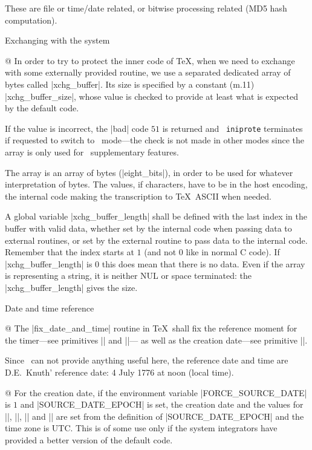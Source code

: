These are file or time/date related, or bitwise processing related
(MD5 hash computation).

\begindiv Exchanging with the system

@ In order to try to protect the inner code of \TeX, when we need to
exchange with some externally provided routine, we use a separated
dedicated array of
bytes called |xchg_buffer|. Its size is specified by a constant (m.11)
|xchg_buffer_size|, whose value is checked to provide at least what is
expected by the default code.

If the value is incorrect, the |bad| code $51$ is returned and {\tt
iniprote} terminates if requested to switch to \Prote\ mode---the check
is not made in other modes since the array is only used for \Prote\
supplementary features.

The array is an array of bytes (|eight_bits|), in order to be used for
whatever interpretation of bytes. The values, if characters, have to be
in the host encoding, the internal code making the transcription to
\TeX\ ASCII when needed.

A global variable |xchg_buffer_length| shall be defined with the
last index in the buffer with valid data, whether set by the internal
code when passing data to external routines, or set by the external
routine to pass data to the internal code. Remember that the index
starts at $1$ (and not $0$ like in normal C code). If |xchg_buffer_length|
is $0$ this does mean that there is no data. Even if the array is
representing a string, it is neither NUL or space terminated: the
|xchg_buffer_length| gives the size.

\enddiv %

\begindiv Date and time reference

@ The |fix_date_and_time| routine in \TeX\ shall fix the reference
moment for the timer---see primitives |\elapsedtime| and |\resettimer|---
as well as the creation date---see primitive |\creationdate|.

Since \PASCAL\ can not provide anything useful here, the reference date
and time are D.E.~Knuth' reference date: 4 July 1776 at noon (local
time).

@ For the creation date, if the environment variable |FORCE_SOURCE_DATE|
is $1$ and |SOURCE_DATE_EPOCH| is set, the creation date and the values
for |\year|, |\month|, |\day| and |\time| are set from the definition of
|SOURCE_DATE_EPOCH| and the time zone is UTC. This is of some use only
if the system integrators have provided a better version of the default
code.

